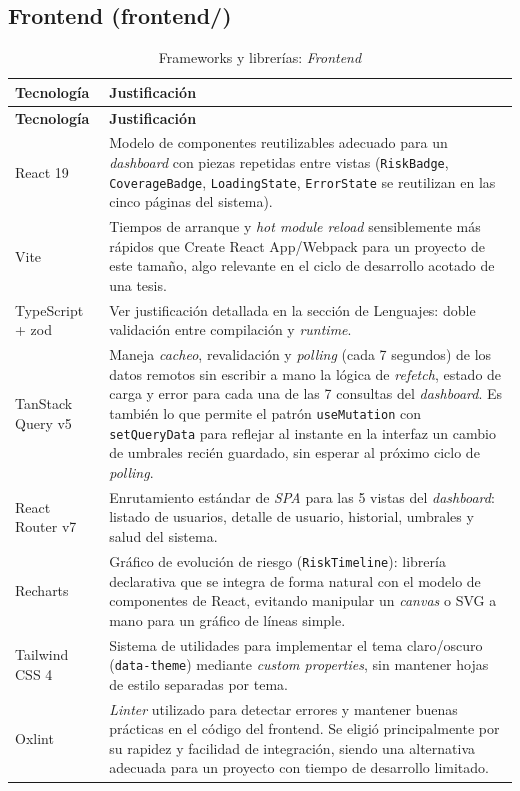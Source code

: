 \subsection{Frontend (frontend/)}
\begin{longtable}{p{3cm}p{11.6cm}}
	\caption{Frameworks y librerías: \emph{Frontend}}
	\label{tab:frameworks-frontend}\\
	\hline
	\textbf{Tecnología} & \textbf{Justificación} \\
	\hline
	\endfirsthead
	\hline
	\textbf{Tecnología} & \textbf{Justificación} \\
	\hline
	\endhead
	React 19 & Modelo de componentes reutilizables adecuado para un \emph{dashboard} con piezas repetidas entre vistas (\texttt{RiskBadge}, \texttt{CoverageBadge}, \texttt{LoadingState}, \texttt{ErrorState} se reutilizan en las cinco páginas del sistema). \\
	\hline
	Vite & Tiempos de arranque y \emph{hot module reload} sensiblemente más rápidos que Create React App/Webpack para un proyecto de este tamaño, algo relevante en el ciclo de desarrollo acotado de una tesis. \\
	\hline
	TypeScript + zod & Ver justificación detallada en la sección de Lenguajes: doble validación entre compilación y \emph{runtime}. \\
	\hline
	TanStack Query v5 & Maneja \emph{cacheo}, revalidación y \emph{polling} (cada 7 segundos) de los datos remotos sin escribir a mano la lógica de \emph{refetch}, estado de carga y error para cada una de las 7 consultas del \emph{dashboard}. Es también lo que permite el patrón \texttt{useMutation} con \texttt{setQueryData} para reflejar al instante en la interfaz un cambio de umbrales recién guardado, sin esperar al próximo ciclo de \emph{polling}. \\
	\hline
	React Router v7 & Enrutamiento estándar de \emph{SPA} para las 5 vistas del \emph{dashboard}: listado de usuarios, detalle de usuario, historial, umbrales y salud del sistema. \\
	\hline
	Recharts & Gráfico de evolución de riesgo (\texttt{RiskTimeline}): librería declarativa que se integra de forma natural con el modelo de componentes de React, evitando manipular un \emph{canvas} o SVG a mano para un gráfico de líneas simple. \\
	\hline
	Tailwind CSS 4 & Sistema de utilidades para implementar el tema claro/oscuro (\texttt{data-theme}) mediante \emph{custom properties}, sin mantener hojas de estilo separadas por tema. \\
	\hline
	Oxlint & \emph{Linter} utilizado para detectar errores y mantener buenas prácticas en el código del frontend. Se eligió principalmente por su rapidez y facilidad de integración, siendo una alternativa adecuada para un proyecto con tiempo de desarrollo limitado.\\
	\hline
\end{longtable}

